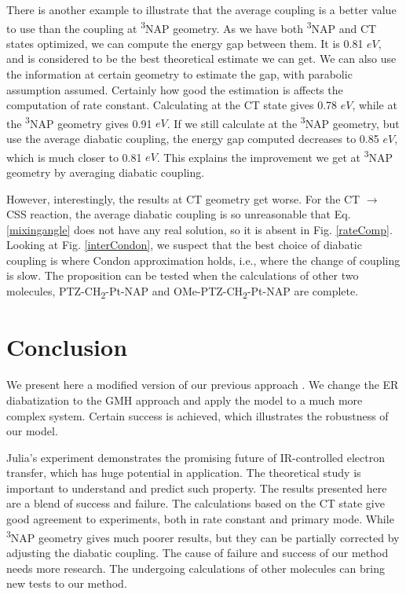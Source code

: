 There is another example to illustrate that the average coupling is a better value to use than the coupling at \textsuperscript{3}NAP geometry. As we have both \textsuperscript{3}NAP and CT states optimized, we can compute the energy gap between them. It is 0.81 $eV$, and is considered to be the best theoretical estimate we can get. We can also use the information at certain geometry to estimate the gap, with parabolic assumption assumed. Certainly how good the estimation is affects the computation of rate constant. Calculating at the CT state gives 0.78 $eV$, while at the \textsuperscript{3}NAP geometry gives 0.91 $eV$. If we still calculate at the \textsuperscript{3}NAP geometry, but use the average diabatic coupling, the energy gap computed decreases to 0.85 $eV$, which is much closer to 0.81 $eV$. This explains the improvement we get at \textsuperscript{3}NAP geometry by averaging diabatic coupling.

However, interestingly, the results at CT geometry get worse. For the CT $\rightarrow$  CSS reaction, the average diabatic coupling is so unreasonable that Eq. \ref{mixingangle} does not have any real solution, so it is absent in Fig. \ref{rateComp}. Looking at Fig. \ref{interCondon}, we suspect that the best choice of diabatic coupling is where Condon approximation holds, i.e., where the change of coupling is slow. The proposition can be tested when the calculations of other two molecules, PTZ-CH\textsubscript{2}-Pt-NAP and OMe-PTZ-CH\textsubscript{2}-Pt-NAP are complete.


\section{Conclusion} %
We present here a modified version of our previous approach \cite{yang2014intramolecular,yang2015computing}. We change the ER diabatization to the GMH approach and apply the model to a much more complex system. Certain success is achieved, which illustrates the robustness of our model.

Julia's experiment demonstrates the promising future of IR-controlled electron transfer, which has huge potential in application. The theoretical study is important to understand and predict such property. The results presented here are a blend of success and failure. The calculations based on the CT state give good agreement to experiments, both in rate constant and primary mode. While \textsuperscript{3}NAP geometry gives much poorer results, but they can be partially corrected by adjusting the diabatic coupling. The cause of failure and success of our method needs more research. The undergoing calculations of other molecules can bring new tests to our method.



